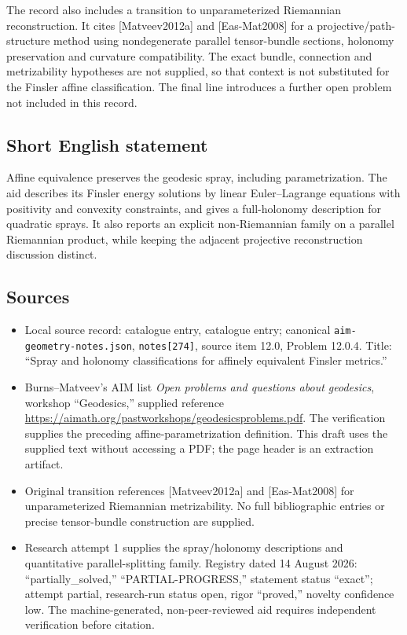 \documentclass[11pt]{article}
\begin{document}
The record also includes a transition to unparameterized Riemannian reconstruction. It cites [Matveev2012a] and [Eas-Mat2008] for a projective/path-structure method using nondegenerate parallel tensor-bundle sections, holonomy preservation and curvature compatibility. The exact bundle, connection and metrizability hypotheses are not supplied, so that context is not substituted for the Finsler affine classification. The final line introduces a further open problem not included in this record.
\subsection{Short English statement}
Affine equivalence preserves the geodesic spray, including parametrization. The aid describes its Finsler energy solutions by linear Euler--Lagrange equations with positivity and convexity constraints, and gives a full-holonomy description for quadratic sprays. It also reports an explicit non-Riemannian family on a parallel Riemannian product, while keeping the adjacent projective reconstruction discussion distinct.
\subsection{Sources}
\begin{itemize}
\item Local source record: catalogue entry, catalogue entry; canonical \texttt{aim-geometry-notes.json}, \texttt{notes[274]}, source item 12.0, Problem 12.0.4. Title: ``Spray and holonomy classifications for affinely equivalent Finsler metrics.''
\item Burns--Matveev's AIM list \emph{Open problems and questions about geodesics}, workshop ``Geodesics,'' supplied reference \url{https://aimath.org/pastworkshops/geodesicsproblems.pdf}. The verification supplies the preceding affine-parametrization definition. This draft uses the supplied text without accessing a PDF; the page header is an extraction artifact.
\item Original transition references [Matveev2012a] and [Eas-Mat2008] for unparameterized Riemannian metrizability. No full bibliographic entries or precise tensor-bundle construction are supplied.
\item Research attempt 1 supplies the spray/holonomy descriptions and quantitative parallel-splitting family. Registry dated 14 August 2026: ``partially\_solved,'' ``PARTIAL-PROGRESS,'' statement status ``exact''; attempt partial, research-run status open, rigor ``proved,'' novelty confidence low. The machine-generated, non-peer-reviewed aid requires independent verification before citation.
\end{itemize}
\end{document}

